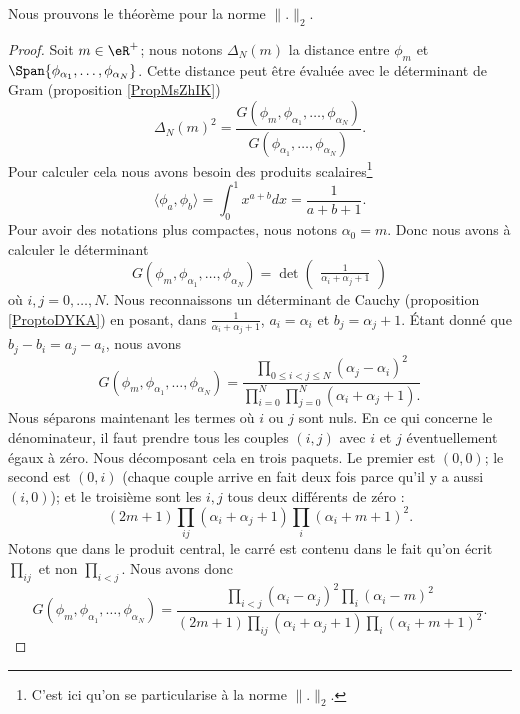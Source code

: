 Nous prouvons le théorème pour la norme \( \| . \|_2\).
\begin{proof}
    Soit \( m\in \eR^+\); nous notons \( \Delta_N(m)\) la distance entre \( \phi_m\) et \( \Span\{ \phi_{\alpha_1},\ldots, \phi_{\alpha_N} \}\). Cette distance peut être évaluée avec le déterminant de Gram (proposition \ref{PropMsZhIK})
    \begin{equation}
        \Delta_N(m)^2=\frac{ G(\phi_m,\phi_{\alpha_1},\ldots, \phi_{\alpha_N}) }{ G(\phi_{\alpha_1},\ldots, \phi_{\alpha_N}) }.
    \end{equation}
    Pour calculer cela nous avons besoin des produits scalaires\footnote{C'est ici qu'on se particularise à la norme \( \| . \|_2\).}
    \begin{equation}
        \langle \phi_a, \phi_b\rangle =\int_0^1 x^{a+b}dx=\frac{1}{ a+b+1 }.
    \end{equation}
    Pour avoir des notations plus compactes, nous notons \( \alpha_0=m\). Donc nous avons à calculer le déterminant
    \begin{equation}
        G(\phi_m,\phi_{\alpha_1},\ldots, \phi_{\alpha_N})=\det\begin{pmatrix}
            \frac{1}{ \alpha_i+\alpha_j+1 }
         \end{pmatrix}
    \end{equation}
    où \( i,j=0,\ldots, N\). Nous reconnaissons un déterminant de Cauchy (proposition \ref{ProptoDYKA}) en posant, dans \( \frac{1}{ \alpha_i+\alpha_j+1 }\), \( a_i=\alpha_i\) et \( b_j=\alpha_j+1\). Étant donné que \( b_j-b_i=a_j-a_i\), nous avons
    \begin{equation}
        G(\phi_m,\phi_{\alpha_1},\ldots, \phi_{\alpha_N})=\frac{ \prod_{0\leq i<j\leq N}  (\alpha_j-\alpha_i)^2 }{ \prod_{i=0}^N\prod_{j=0}^N (\alpha_i+\alpha_j+1).}
    \end{equation}
    Nous séparons maintenant les termes où \( i\) ou \( j\) sont nuls. En ce qui concerne le dénominateur, il faut prendre tous les couples \( (i,j)\) avec \( i\) et \( j\) éventuellement égaux à zéro. Nous décomposant cela en trois paquets. Le premier est \( (0,0)\); le second est \( (0,i)\) (chaque couple arrive en fait deux fois parce qu'il y a aussi \( (i,0)\)); et le troisième sont les \( i,j\) tous deux différents de zéro :
    \begin{equation}
        (2m+1)\prod_{ij}(\alpha_i+\alpha_j+1)\prod_i(\alpha_i+m+1)^2.
    \end{equation}
    Notons que dans le produit central, le carré est contenu dans le fait qu'on écrit \( \prod_{ij}\) et non \( \prod_{i<j}\). Nous avons donc
    \begin{equation}
        G(\phi_m,\phi_{\alpha_1},\ldots, \phi_{\alpha_N})=\frac{ \prod_{i<j}(\alpha_i-\alpha_j)^2\prod_i(\alpha_i-m)^2 }{ (2m+1)\prod_{ij}(\alpha_i+\alpha_j+1)\prod_i(\alpha_i+m+1)^2 }.
    \end{equation}
    

\end{proof}

